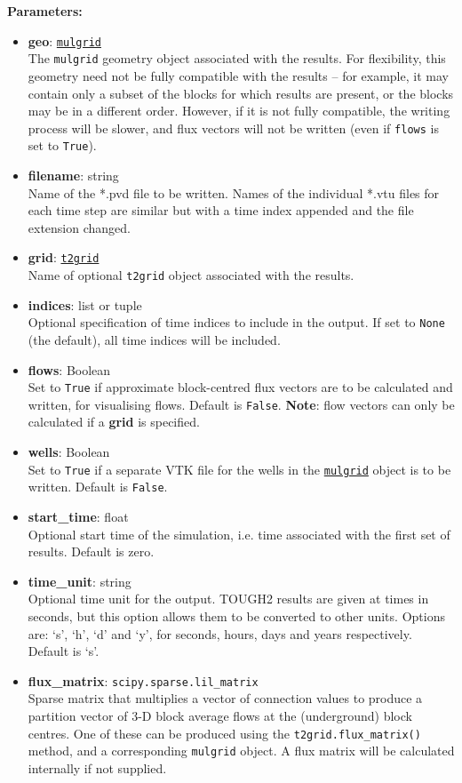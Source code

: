 \textbf{Parameters:}
\begin{itemize}
\item \textbf{geo}: \hyperref[mulgrids]{\texttt{mulgrid}}\\
  The \texttt{mulgrid} geometry object associated with the results.  For flexibility, this geometry need not be fully compatible with the results -- for example, it may contain only a subset of the blocks for which results are present, or the blocks may be in a different order.  However, if it is not fully compatible, the writing process will be slower, and flux vectors will not be written (even if \texttt{flows} is set to \texttt{True}).
\item \textbf{filename}: string\\
  Name of the *.pvd file to be written.  Names of the individual *.vtu files for each time step are similar but with a time index appended and the file extension changed.
\item \textbf{grid}: \hyperref[t2grids]{\texttt{t2grid}}\\
  Name of optional \texttt{t2grid} object associated with the results.
\item \textbf{indices}: list or tuple\\
  Optional specification of time indices to include in the output.  If set to \texttt{None} (the default), all time indices will be included.
\item \textbf{flows}: Boolean\\
  Set to \texttt{True} if approximate block-centred flux vectors are to be calculated and written, for visualising flows.  Default is \texttt{False}.  \textbf{Note}: flow vectors can only be calculated if a \textbf{grid} is specified.
\item \textbf{wells}: Boolean\\
  Set to \texttt{True} if a separate VTK file for the wells in the \hyperref[mulgrids]{\texttt{mulgrid}} object is to be written.  Default is \texttt{False}.
\item \textbf{start\_time}: float\\
  Optional start time of the simulation, i.e. time associated with the first set of results.  Default is zero.
\item \textbf{time\_unit}: string\\
  Optional time unit for the output.  TOUGH2 results are given at times in seconds, but this option allows them to be converted to other units.  Options are: `s', `h', `d' and `y', for seconds, hours, days and years respectively.  Default is `s'.
\item \textbf{flux\_matrix}: \texttt{scipy.sparse.lil\_matrix}\\
  Sparse matrix that multiplies a vector of connection values to produce a partition vector of 3-D block average flows at the (underground) block centres.  One of these can be produced using the \texttt{t2grid.flux\_matrix()} method, and a corresponding \texttt{mulgrid} object.  A flux matrix will be calculated internally if not supplied.
\end{itemize}

